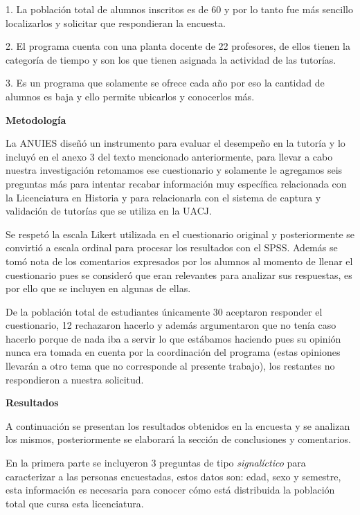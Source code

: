 \begin{Obs}
\item[1.] La población total  de alumnos inscritos es de 60 y por lo tanto fue más
sencillo localizarlos y  solicitar que respondieran la encuesta.
\item[2.] El programa cuenta con una planta docente de 22 profesores, de ellos
tienen la categoría de tiempo  y son los que tienen asignada la actividad
de las tutorías.
\item[3.] Es un programa que solamente se ofrece cada año  por eso la cantidad de
alumnos es baja y ello permite ubicarlos y conocerlos más.
\end{Obs}

\medskip
\textbf{Metodología}

La ANUIES diseñó un instrumento para evaluar el desempeño en la tutoría y lo
incluyó en el  anexo 3 del texto mencionado anteriormente,  para llevar a
cabo nuestra investigación retomamos ese cuestionario y solamente le
agregamos  seis preguntas más para intentar recabar información muy
específica  relacionada con la Licenciatura en Historia y para relacionarla
con  el sistema de captura  y validación de tutorías que se utiliza en la
UACJ.


Se respetó la escala Likert utilizada en el cuestionario original y
posteriormente se convirtió a escala ordinal para procesar los resultados
con el SPSS. Además se tomó nota de los comentarios expresados por los
alumnos al momento de llenar el cuestionario pues se consideró que eran
relevantes para analizar sus respuestas, es por ello que se incluyen en
algunas de ellas.


De la población total de estudiantes únicamente 30 aceptaron
responder el cuestionario, 12 rechazaron hacerlo y además argumentaron que
no tenía caso hacerlo porque de nada iba a servir lo que estábamos haciendo
pues su opinión nunca era tomada en cuenta por la coordinación del programa
(estas opiniones llevarán a otro tema que no corresponde al presente
trabajo), los restantes no respondieron a nuestra solicitud.


\medskip
\textbf{Resultados}

A continuación se presentan los resultados obtenidos en la encuesta y se
analizan los mismos, posteriormente se elaborará la sección de conclusiones
y comentarios.


En la primera parte se incluyeron 3 preguntas de tipo \textit{signalíctico} para
caracterizar a las personas encuestadas, estos datos son: edad, sexo y
semestre, esta información es necesaria para conocer cómo está distribuida
la población total que cursa esta licenciatura.

